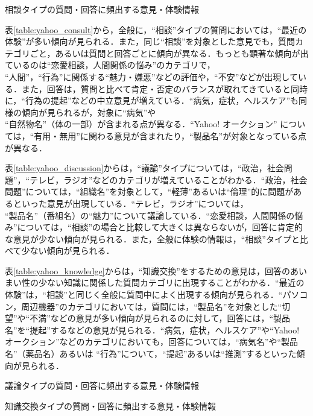 \documentclass[japanese]{jnlp_1.4}
\begin{document}
\begin{table}[t]
\caption{相談タイプの質問・回答に頻出する意見・体験情報}
\label{table:yahoo_consult}

\end{table}

表\ref{table:yahoo_consult}から，全般に，``相談''タイプの質問においては，``最近の体験''が多い傾向が見られる．また，同じ``相談''を対象とした意見でも，質問カテゴリごと，あるいは質問と回答ごとに傾向が異なる．もっとも顕著な傾向が出ているのは``恋愛相談，人間関係の悩み''のカテゴリで，\\
``人間''，``行為''に関係する``魅力・嫌悪''などの評価や，``不安''などが出現している．また，回答は，質問と比べて肯定・否定のバランスが取れてきていると同時に，``行為の提起''などの中立意見が増えている．``病気，症状，ヘルスケア''も同様の傾向が見られるが，対象に``病気''や\\``自然物名''（体の一部）が含まれる点が異なる．``Yahoo! オークション'' については，``有用・無用''に関わる意見が含まれたり，``製品名''が対象となっている点が異なる．

表\ref{table:yahoo_discussion}からは，``議論''タイプについては，``政治，社会問題''，``テレビ，ラジオ''などのカテゴリが増えていることがわかる．``政治，社会問題''については，``組織名''を対象として，``軽薄''あるいは``倫理''的に問題があるといった意見が出現している．``テレビ，ラジオ''については，\\``製品名''（番組名）の``魅力''について議論している．``恋愛相談，人間関係の悩み''については，``相談''の場合と比較して大きくは異ならないが，回答に肯定的な意見が少ない傾向が見られる．また，全般に体験の情報は，``相談''タイプと比べて少ない傾向が見られる．

表\ref{table:yahoo_knowledge}からは，``知識交換''をするための意見は，回答のあいまい性の少ない知識に関係した質問カテゴリに出現することがわかる．``最近の体験''は，``相談''と同じく全般に質問中によく出現する傾向が見られる．``パソコン，周辺機器''のカテゴリにおいては，質問には，``製品名''を対象とした``切望''や``不満''などの意見が多い傾向が見られるのに対して，回答には，``製品名''を``提起''するなどの意見が見られる．``病気，症状，ヘルスケア''や``Yahoo! オークション''などのカテゴリにおいても，回答については，``病気名''や``製品名''（薬品名）あるいは
``行為''について，``提起''あるいは``推測''するといった傾向が見られる．

\begin{table}[t]
\caption{議論タイプの質問・回答に頻出する意見・体験情報}
\label{table:yahoo_discussion}

\end{table}
\begin{table}[t]
\caption{知識交換タイプの質問・回答に頻出する意見・体験情報}
\label{table:yahoo_knowledge}

\end{table}
\end{document}
